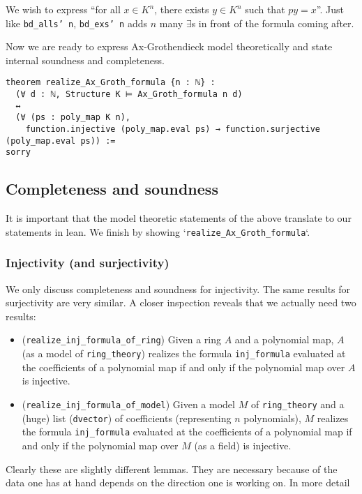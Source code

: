 We wish to express ``for all $x \in K^{n}$, there exists $y \in K^{n}$ such that $p y = x$''.
Just like \texttt{bd\_alls' n}, \texttt{bd\_exs' n} adds $n$ many $\exists$s in front of the
formula coming after.

Now we are ready to express Ax-Grothendieck model theoretically and state internal
soundness and completeness.
\begin{lstlisting}
theorem realize_Ax_Groth_formula {n : ℕ} :
  (∀ d : ℕ, Structure K ⊨ Ax_Groth_formula n d)
  ↔
  (∀ (ps : poly_map K n),
    function.injective (poly_map.eval ps) → function.surjective (poly_map.eval ps)) :=
sorry
\end{lstlisting}

\subsection{Completeness and soundness}

It is important that the model theoretic statements of the above translate to
our statements in lean. We finish by showing `\texttt{realize\_Ax\_Groth\_formula}`.

\subsubsection*{Injectivity (and surjectivity)}

We only discuss completeness and soundness for injectivity.
The same results for surjectivity are very similar.
A closer inspection reveals that we actually need two results:
\begin{itemize}
  \item (\texttt{realize\_inj\_formula\_of\_ring})
    Given a ring $A$ and a polynomial map,
    $A$ (as a model of \texttt{ring\_theory})
    realizes the formula \texttt{inj\_formula} evaluated at the coefficients
    of a polynomial map if and only if the polynomial map over $A$ is injective.
  \item (\texttt{realize\_inj\_formula\_of\_model})
    Given a model $M$ of \texttt{ring\_theory} and a (huge) list
    (\texttt{dvector}) of coefficients (representing $n$ polynomials),
    $M$ realizes the formula
    \texttt{inj\_formula} evaluated at the coefficients of a polynomial map
    if and only if the polynomial map over $M$ (as a field) is injective.
\end{itemize}

Clearly these are slightly different lemmas.
They are necessary because of the data one has at hand
depends on the direction one is working on.
In more detail

